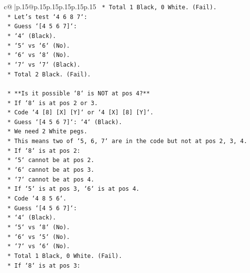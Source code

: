 \documentclass{article}
\begin{document}
{\begin{supertabular}{c@{$\;$}|p{.15\linewidth}@{}p{.15\linewidth}p{.15\linewidth}p{.15\linewidth}p{.15\linewidth}p{.15\linewidth}}
{{{\texttt{                    *   Total 1 Black, 0 White. (Fail).} \\
\texttt{            *   Let's test `4 6 8 7`:} \\
\texttt{                *   Guess `{[}4 5 6 7{]}`:} \\
\texttt{                    *   `4` (Black).} \\
\texttt{                    *   `5` vs `6` (No).} \\
\texttt{                    *   `6` vs `8` (No).} \\
\texttt{                    *   `7` vs `7` (Black).} \\
\texttt{                    *   Total 2 Black. (Fail).} \\
\\ 
\texttt{    *   **Is it possible `8` is NOT at pos 4?**} \\
\texttt{        *   If `8` is at pos 2 or 3.} \\
\texttt{        *   Code `4 {[}8{]} {[}X{]} {[}Y{]}` or `4 {[}X{]} {[}8{]} {[}Y{]}`.} \\
\texttt{        *   Guess `{[}4 5 6 7{]}`: `4` (Black).} \\
\texttt{        *   We need 2 White pegs.} \\
\texttt{        *   This means two of `5, 6, 7` are in the code but not at pos 2, 3, 4.} \\
\texttt{        *   If `8` is at pos 2:} \\
\texttt{            *   `5` cannot be at pos 2.} \\
\texttt{            *   `6` cannot be at pos 3.} \\
\texttt{            *   `7` cannot be at pos 4.} \\
\texttt{            *   If `5` is at pos 3, `6` is at pos 4.} \\
\texttt{            *   Code `4 8 5 6`.} \\
\texttt{            *   Guess `{[}4 5 6 7{]}`:} \\
\texttt{                *   `4` (Black).} \\
\texttt{                *   `5` vs `8` (No).} \\
\texttt{                *   `6` vs `5` (No).} \\
\texttt{                *   `7` vs `6` (No).} \\
\texttt{                *   Total 1 Black, 0 White. (Fail).} \\
\texttt{        *   If `8` is at pos 3:} \\
}}}
\end{supertabular}}
\end{document}
